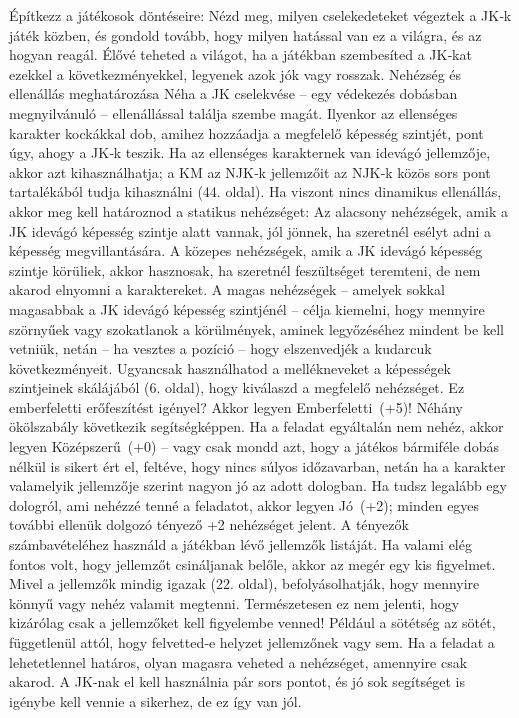 \documentclass[oneside]{book}
\begin{document}
Építkezz a játékosok döntéseire: Nézd meg, milyen cselekedeteket végeztek a JK‑k játék közben, és gondold tovább, hogy milyen hatással van ez a világra, és az hogyan reagál. Élővé teheted a világot, ha a játékban szembesíted a JK‑kat ezekkel a következményekkel, legyenek azok jók vagy rosszak.
Nehézség és ellenállás meghatározása
Néha a JK cselekvése – egy védekezés dobásban megnyilvánuló – ellenállással találja szembe magát. Ilyenkor az ellenséges karakter kockákkal dob, amihez hozzáadja a megfelelő képesség szintjét, pont úgy, ahogy a JK‑k teszik. Ha az ellenséges karakternek van idevágó jellemzője, akkor azt kihasználhatja; a KM az NJK‑k jellemzőit az NJK‑k közös sors pont tartalékából tudja kihasználni (44. oldal).
Ha viszont nincs dinamikus ellenállás, akkor meg kell határoznod a statikus nehézséget:
Az alacsony nehézségek, amik a JK idevágó képesség szintje alatt vannak, jól jönnek, ha szeretnél esélyt adni a képesség megvillantására.
A közepes nehézségek, amik a JK idevágó képesség szintje körüliek, akkor hasznosak, ha szeretnél feszültséget teremteni, de nem akarod elnyomni a karaktereket.
A magas nehézségek – amelyek sokkal magasabbak a JK idevágó képesség szintjénél – célja kiemelni, hogy mennyire szörnyűek vagy szokatlanok a körülmények, aminek legyőzéséhez mindent be kell vetniük, netán – ha vesztes a pozíció – hogy elszenvedjék a kudarcuk következményeit.
Ugyancsak használhatod a mellékneveket a képességek szintjeinek skálájából (6. oldal), hogy kiválaszd a megfelelő nehézséget. Ez emberfeletti erőfeszítést igényel? Akkor legyen Emberfeletti~(+5)! Néhány ökölszabály következik segítségképpen.
Ha a feladat egyáltalán nem nehéz, akkor legyen Középszerű~(+0) – vagy csak mondd azt, hogy a játékos bármiféle dobás nélkül is sikert ért el, feltéve, hogy nincs súlyos időzavarban, netán ha a karakter valamelyik jellemzője szerint nagyon jó az adott dologban.
Ha tudsz legalább egy dologról, ami nehézzé tenné a feladatot, akkor legyen Jó~(+2); minden egyes további ellenük dolgozó tényező +2 nehézséget jelent.
A tényezők számbavételéhez használd a játékban lévő jellemzők listáját. Ha valami elég fontos volt, hogy jellemzőt csináljanak belőle, akkor az megér egy kis figyelmet. Mivel a jellemzők mindig igazak (22. oldal), befolyásolhatják, hogy mennyire könnyű vagy nehéz valamit megtenni. Természetesen ez nem jelenti, hogy kizárólag csak a jellemzőket kell figyelembe venned! Például a sötétség az sötét, függetlenül attól, hogy felvetted‑e helyzet jellemzőnek vagy sem.
Ha a feladat a lehetetlennel határos, olyan magasra veheted a nehézséget, amennyire csak akarod. A JK‑nak el kell használnia pár sors pontot, és jó sok segítséget is igénybe kell vennie a sikerhez, de ez így van jól.
\end{document}
